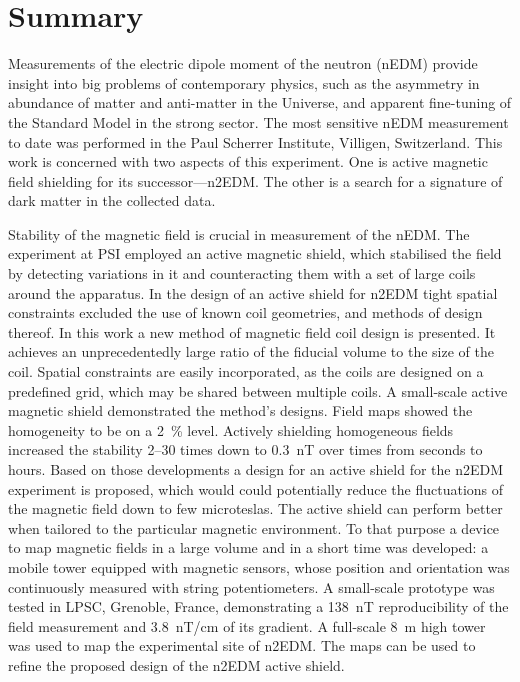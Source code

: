 

\begingroup
\let\clearpage\relax
\let\cleardoublepage\relax
\let\cleardoublepage\relax

\chapter*{Summary} %
Measurements of the electric dipole moment of the neutron (nEDM) provide insight into big problems of contemporary physics, such as the asymmetry in abundance of matter and anti-matter in the Universe, and apparent fine-tuning of the Standard Model in the strong sector. The most sensitive nEDM measurement to date was performed in the Paul Scherrer Institute, Villigen, Switzerland. This work is concerned with two aspects of this experiment. One is active magnetic field shielding for its successor---n2EDM\@. The other is a search for a signature of dark matter in the collected data.

Stability of the magnetic field is crucial in measurement of the nEDM\@. The experiment at PSI employed an active magnetic shield, which stabilised the field by detecting  variations in it and counteracting them with a set of large coils around the apparatus.
In the design of an active shield for n2EDM tight spatial constraints excluded the use of known coil geometries, and methods of design thereof.
In this work a new method of magnetic field coil design is presented. It achieves an unprecedentedly large ratio of the fiducial volume to the size of the coil.
Spatial constraints are easily incorporated, as the coils are designed on a predefined grid, which may be shared between multiple coils.
A small-scale active magnetic shield demonstrated the method's designs. Field maps showed the homogeneity to be on a \SI{2}{\percent} level.
Actively shielding homogeneous fields increased the stability 2--30 times down to \SI{0.3}{nT} over times from seconds to hours.
Based on those developments a design for an active shield for the n2EDM experiment is proposed, which would could potentially reduce the fluctuations of the magnetic field down to few microteslas. The active shield can perform better when tailored to the particular magnetic environment. To that purpose a device to map magnetic fields in a large volume and in a short time was developed: a mobile tower equipped with magnetic sensors, whose position and orientation was continuously measured with string potentiometers. A small-scale prototype was tested in LPSC, Grenoble, France, demonstrating a \SI{138}{nT} reproducibility of the field measurement and \SI{3.8}{nT/cm} of its gradient. A full-scale \SI{8}{m} high tower was used to map the experimental site of n2EDM\@. The maps can be used to refine the proposed design of the n2EDM active shield.

